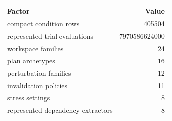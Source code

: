 \begin{tabular}{lr}
\toprule
Factor & Value \\
\midrule
compact condition rows & 405504 \\
represented trial evaluations & 7970586624000 \\
workspace families & 24 \\
plan archetypes & 16 \\
perturbation families & 12 \\
invalidation policies & 11 \\
stress settings & 8 \\
represented dependency extractors & 8 \\
\bottomrule
\end{tabular}
